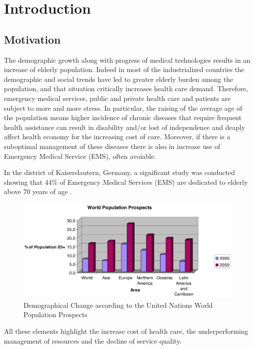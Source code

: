 \documentclass{thesisreport}
\begin{document}
 \tableofcontents
 
 
 \chapter{Introduction}

\section{Motivation}
  The demographic growth along with progress of medical technologies results in an increase of elderly population. Indeed in most of the industrialized countries the demographic and social trends have led to greater elderly burden among the population, and that situation critically increases health care demand. Therefore, emergency medical services, public and private health care and patients are subject to more and more stress. 
  In particular, the raising of the average age of the population means higher incidence of chronic diseases that require frequent health assistance can result in disability and/or lost of independence and deaply affect health economy for the increasing cost of care. Moreover, if there is a suboptimal management of these diseases there is also in increase use of Emergency Medical Service (EMS), often avoiable.
 
 In the district of Kaiserslautern, Germany, a significant study was conducted showing that 44\% of Emergency Medical Services (EMS) are dedicated to elderly above 70 years of age \cite{kleinberger2007ambient}.
 	\begin{figure}[H]
		\centering
		\includegraphics[width=15cm]{Thesis/data/populationProspect.png}
		\caption{\small{Demographical Change according to the United Nations World Population Prospects \cite{kleinberger2007ambient}}}
		\label{fig:populationProspect}
	\end{figure}
 All these elements highlight the increase cost of health care, the underperforming management of resources and the decline of service quality.
 
\end{document}
